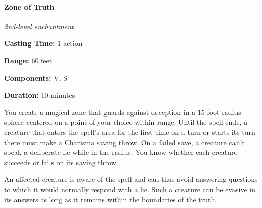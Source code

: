 \documentclass[
]{article}
\begin{document}
\hypertarget{zone-of-truth}{%
\paragraph{Zone of Truth}\label{zone-of-truth}}

\emph{2nd-level enchantment}

\textbf{Casting Time:} 1 action

\textbf{Range:} 60 feet

\textbf{Components:} V, S

\textbf{Duration:} 10 minutes

You create a magical zone that guards against deception in a
15-foot-radius sphere centered on a point of your choice within range.
Until the spell ends, a creature that enters the spell's area for the
first time on a turn or starts its turn there must make a Charisma
saving throw. On a failed save, a creature can't speak a deliberate lie
while in the radius. You know whether each creature succeeds or fails on
its saving throw.

An affected creature is aware of the spell and can thus avoid answering
questions to which it would normally respond with a lie. Such a creature
can be evasive in its answers as long as it remains within the
boundaries of the truth.
\end{document}
